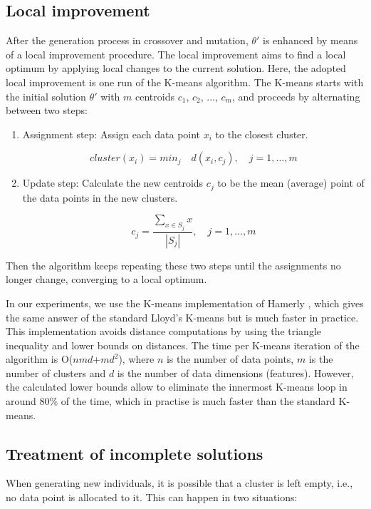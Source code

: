 \subsection{Local improvement}
\label{subsec:local-improvement}
After the generation process in crossover and mutation, $\theta'$ is enhanced by means of a local improvement procedure. The local improvement aims to find a local optimum by applying local changes to the current solution. Here, the adopted local improvement is one run of the K-means algorithm. The K-means starts with the initial solution $\theta'$ with $m$ centroids $c_1$, $c_2$, ..., $c_m$, and proceeds by alternating between two steps:

\begin{enumerate}

	\item Assignment step: Assign each data point $x_i$ to the closest cluster.
	
	\begin{equation}
	cluster(x_i) = min_j \quad d(x_i, c_j), \quad j = 1,...,m
	\end{equation}
	
	\item Update step: Calculate the new centroids $c_j$ to be the mean (average) point of the data points in the new clusters.
	
	\begin{equation}
	c_j = \frac{\sum_{x \in S_j}x}{\left | S_j \right |}, \quad j = 1,...,m
	\end{equation}
		
\end{enumerate}

Then the algorithm keeps repeating these two steps until the assignments no longer change, converging to a local optimum.

In our experiments, we use the K-means implementation of Hamerly \cite{Hamerly2010}, which gives the same answer of the standard Lloyd's K-means \cite{Lloyd1982} but is much faster in practice. This implementation avoids distance computations by using the triangle inequality and lower bounds on distances. The time per K-means iteration of the algorithm is O($nmd$+$md^2$), where $n$ is the number of data points, $m$ is the number of clusters and $d$ is the number of data dimensions (features). However, the calculated lower bounds allow to eliminate the innermost K-means loop in around 80\% of the time, which in practise is much faster than the standard K-means.

\subsection{Treatment of incomplete solutions}
When generating new individuals, it is possible that a cluster is left empty, i.e., no data point is allocated to it. This can happen in two situations: 

